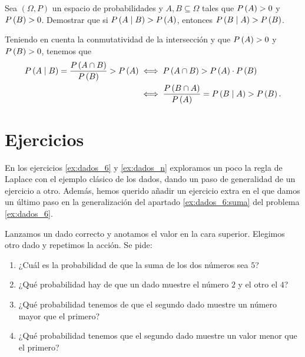 \begin{exercise*}
  Sea $(\Omega, P)$ un espacio de probabilidades y $A, B \subseteq \Omega$
  tales que $P\left(A\right) > 0$ y $P\left(B\right) > 0$. Demostrar que si $P\left(A \mid
  B\right) > P\left(A\right)$, entonces $P\left(B \mid A\right) > P\left(B\right)$. 
\end{exercise*}

\begin{cproof}
  Teniendo en cuenta la conmutatividad de la intersección y que $P\left(A\right) >
  0$ y $P\left(B\right) > 0$, tenemos que
  \[
    \begin{split}
      P\left(A \mid B\right) = \frac{P\left(A \cap B\right)}{P\left(B\right)} > P\left(A\right) &\iff
      P\left(A \cap B\right) > P\left(A\right) \cdot P\left(B\right) \\
      &\iff \frac{P\left(B \cap A\right)}{P\left(A\right)} = P\left(B \mid A\right) > P\left(B\right).
    \end{split}
  \]
\end{cproof}

\section{Ejercicios}

En los ejercicios \ref{ex:dados_6} y \ref{ex:dados_n} exploramos un poco la
regla de Laplace con el ejemplo clásico de los dados, dando un paso de
generalidad de un ejercicio a otro. Además, hemos querido añadir un
ejercicio extra en el que damos un último paso en la generalización del
apartado \ref{ex:dados_6:suma} del problema \ref{ex:dados_6}.

\setcounter{problem}{1}

\begin{exercise} \label{ex:dados_6} Lanzamos un dado correcto y anotamos el
  valor en la cara superior. Elegimos otro dado y repetimos la acción. Se
  pide:
  \begin{enumerate}
    \item ¿Cuál es la probabilidad de que la suma de los dos números sea
    $5$? \label{ex:dados_6:suma}
    \item ¿Qué probabilidad hay de que un dado muestre el número $2$ y el
    otro el $4$?
    \item ¿Qué probabilidad tenemos de que el segundo dado muestre un
    número mayor que el primero?
    \item ¿Qué probabilidad tenemos que el segundo dado muestre un valor
    menor que el primero?
  \end{enumerate}
\end{exercise}

